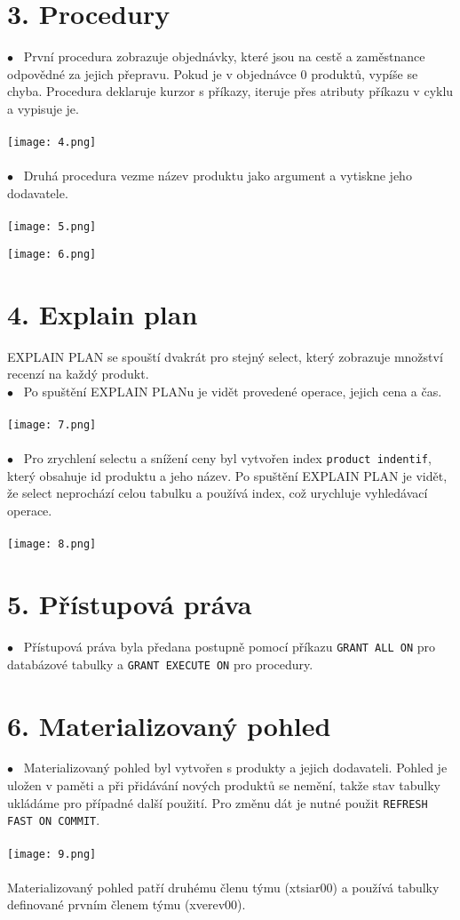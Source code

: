 \documentclass[12pt]{article}
\begin{document}
\section*{3. Procedury}
    $\bullet$~ První procedura zobrazuje objednávky, které jsou na cestě a zaměstnance odpovědné za jejich přepravu. Pokud je v objednávce 0 produktů, vypíše se chyba. Procedura deklaruje kurzor s příkazy, iteruje přes atributy příkazu v cyklu a vypisuje je.
    \\
    \\
    \texttt{[image: 4.png]}
    \\
    \\
    $\bullet$~ Druhá procedura vezme název produktu jako argument a vytiskne jeho dodavatele. 
    \\
    \\
    \texttt{[image: 5.png]}

    \texttt{[image: 6.png]}

\section*{4. Explain plan}
    EXPLAIN PLAN se spouští dvakrát pro stejný select, který zobrazuje množství recenzí na každý produkt.\\
    $\bullet$~ Po spuštění EXPLAIN PLANu je vidět provedené operace, jejich cena a čas.
    \\
    \\
    \texttt{[image: 7.png]}
    \\
    \\
    $\bullet$~ Pro zrychlení selectu a snížení ceny byl vytvořen index \texttt{product indentif}, který obsahuje id produktu a jeho název. Po spuštění EXPLAIN PLAN je vidět, že select neprochází celou tabulku a používá index, což urychluje vyhledávací operace.
    \\
    \\
    \texttt{[image: 8.png]}

 \section*{5. Přístupová práva}
    $\bullet$~ Přístupová práva byla předana postupně pomocí příkazu \texttt{GRANT ALL ON} pro databázové tabulky a \texttt{GRANT EXECUTE ON} pro procedury.

\section*{6. Materializovaný pohled}
    $\bullet$~ Materializovaný pohled byl vytvořen s produkty a jejich dodavateli. Pohled je uložen v paměti a při přidávání nových produktů se nemění, takže stav tabulky ukládáme pro případné další použití. Pro změnu dát je nutné použit \texttt{REFRESH FAST ON COMMIT}.
    \\
    \\
    \texttt{[image: 9.png]}
    \\
    \\
    Materializovaný pohled patří druhému členu týmu (xtsiar00) a používá tabulky definované prvním členem týmu (xverev00).
\end{document}

